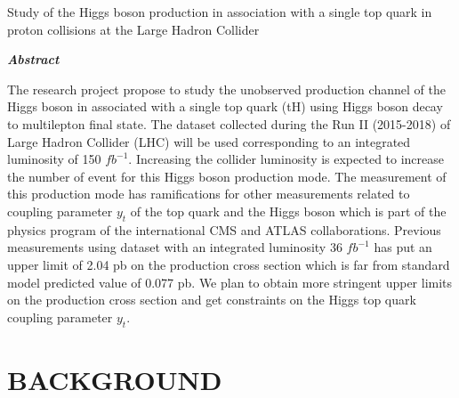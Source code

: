 \documentclass[final,3p]{CSP}
\def\ProjectTitle{Study of the Higgs boson production in association with a single top quark in proton collisions at the Large Hadron Collider}
\begin{document}
\begin{adjustwidth}{1cm}{1cm}

  \begin{center}
    {\Large \ProjectTitle \par}
    \vspace{1cm}
    {\itshape\textbf{Abstract}\par}
  \end{center}
  
  \vspace{1 cm}
 
  
\onehalfspacing The research project propose to study the unobserved production channel of the Higgs boson in associated with a single top quark (tH) using Higgs boson decay to multilepton final state. The dataset collected during the Run II (2015-2018) of Large Hadron Collider (LHC) will be used corresponding to an integrated luminosity of 150 $fb^{-1}$. Increasing the collider luminosity is expected to increase the number of event for this Higgs boson production mode. The measurement of this production mode has ramifications for other measurements related to coupling parameter $y_t$ of the top quark and the Higgs boson which is part of the physics program of the international CMS and ATLAS collaborations. Previous measurements using dataset with an integrated luminosity 36 $fb^{-1}$ has put an upper limit of 2.04 pb on the production cross section which is far from standard model predicted value of 0.077 pb. We plan to obtain more stringent upper limits on the production cross section and get constraints on the Higgs top quark coupling parameter $y_t$. \par

\end{adjustwidth}

\hspace{2pt}
\vfill

\newpage
\section{BACKGROUND}
\end{document}
